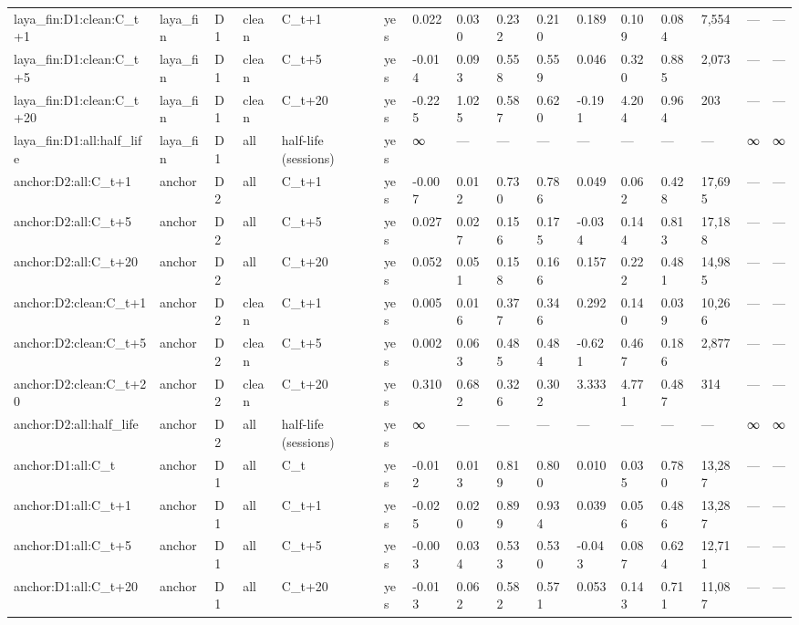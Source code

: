 \begin{tabular}{llllllllllllllll}
laya\_fin:D1:clean:C\_t+1 & laya\_fin & D1 & clean & C\_t+1 & yes & 0.022 & 0.030 & 0.232 & 0.210 & 0.189 & 0.109 & 0.084 & 7,554 & — & — \\
laya\_fin:D1:clean:C\_t+5 & laya\_fin & D1 & clean & C\_t+5 & yes & -0.014 & 0.093 & 0.558 & 0.559 & 0.046 & 0.320 & 0.885 & 2,073 & — & — \\
laya\_fin:D1:clean:C\_t+20 & laya\_fin & D1 & clean & C\_t+20 & yes & -0.225 & 1.025 & 0.587 & 0.620 & -0.191 & 4.204 & 0.964 & 203 & — & — \\
laya\_fin:D1:all:half\_life & laya\_fin & D1 & all & half-life (sessions) & yes & ∞ & — & — & — & — & — & — & — & ∞ & ∞ \\
anchor:D2:all:C\_t+1 & anchor & D2 & all & C\_t+1 & yes & -0.007 & 0.012 & 0.730 & 0.786 & 0.049 & 0.062 & 0.428 & 17,695 & — & — \\
anchor:D2:all:C\_t+5 & anchor & D2 & all & C\_t+5 & yes & 0.027 & 0.027 & 0.156 & 0.175 & -0.034 & 0.144 & 0.813 & 17,188 & — & — \\
anchor:D2:all:C\_t+20 & anchor & D2 & all & C\_t+20 & yes & 0.052 & 0.051 & 0.158 & 0.166 & 0.157 & 0.222 & 0.481 & 14,985 & — & — \\
anchor:D2:clean:C\_t+1 & anchor & D2 & clean & C\_t+1 & yes & 0.005 & 0.016 & 0.377 & 0.346 & 0.292 & 0.140 & 0.039 & 10,266 & — & — \\
anchor:D2:clean:C\_t+5 & anchor & D2 & clean & C\_t+5 & yes & 0.002 & 0.063 & 0.485 & 0.484 & -0.621 & 0.467 & 0.186 & 2,877 & — & — \\
anchor:D2:clean:C\_t+20 & anchor & D2 & clean & C\_t+20 & yes & 0.310 & 0.682 & 0.326 & 0.302 & 3.333 & 4.771 & 0.487 & 314 & — & — \\
anchor:D2:all:half\_life & anchor & D2 & all & half-life (sessions) & yes & ∞ & — & — & — & — & — & — & — & ∞ & ∞ \\
anchor:D1:all:C\_t & anchor & D1 & all & C\_t & yes & -0.012 & 0.013 & 0.819 & 0.800 & 0.010 & 0.035 & 0.780 & 13,287 & — & — \\
anchor:D1:all:C\_t+1 & anchor & D1 & all & C\_t+1 & yes & -0.025 & 0.020 & 0.899 & 0.934 & 0.039 & 0.056 & 0.486 & 13,287 & — & — \\
anchor:D1:all:C\_t+5 & anchor & D1 & all & C\_t+5 & yes & -0.003 & 0.034 & 0.533 & 0.530 & -0.043 & 0.087 & 0.624 & 12,711 & — & — \\
anchor:D1:all:C\_t+20 & anchor & D1 & all & C\_t+20 & yes & -0.013 & 0.062 & 0.582 & 0.571 & 0.053 & 0.143 & 0.711 & 11,087 & — & — \\

\end{tabular}
